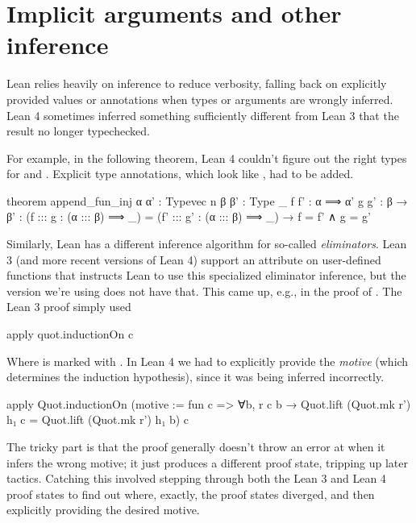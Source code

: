 \section{Implicit arguments and other inference}
Lean relies heavily on inference to reduce verbosity, falling back on explicitly provided
values or annotations when types or arguments are wrongly inferred.
Lean 4 sometimes inferred something sufficiently different from Lean 3 that the result no longer
typechecked.



For example, in the following theorem, Lean 4 couldn't figure out the right types for  and 
. Explicit type annotations, which look like , had to be added.
\begin{leancode}
  theorem append_fun_inj {α α' : Typevec n} {β β' : Type _} 
                         {f f' : α ⟹ α'} {g g' : β → β'} :
    (f ::: g : (α ::: β) ⟹ _) = (f' ::: g' : (α ::: β) ⟹ _) 
      → f = f' ∧ g = g'
\end{leancode}


Similarly, Lean has a different inference algorithm for so-called \emph{eliminators}.
Lean 3 (and more recent versions of Lean 4) support an  attribute on user-defined
functions that instructs Lean to use this specialized eliminator inference, but the version we're using
does not have that.
This came up, e.g., in the proof of . The Lean 3 proof simply used
\begin{leancode}    
  apply quot.inductionOn c
\end{leancode}  
Where  is marked with .
In Lean 4 we had to explicitly provide the \emph{motive} (which determines the induction hypothesis), 
since it was being inferred incorrectly.
\begin{leancode}
  apply Quot.inductionOn (motive := fun c => ∀b, r c b → 
        Quot.lift (Quot.mk r') h₁ c = Quot.lift (Quot.mk r') h₁ b) c
\end{leancode}

The tricky part is that the proof generally doesn't throw an error at  when it
infers the wrong motive; it just produces a different proof state, tripping up later tactics.
Catching this involved stepping through both the Lean 3 and Lean 4 proof states to find out where, exactly, the proof states diverged, 
and then explicitly providing the desired motive.

